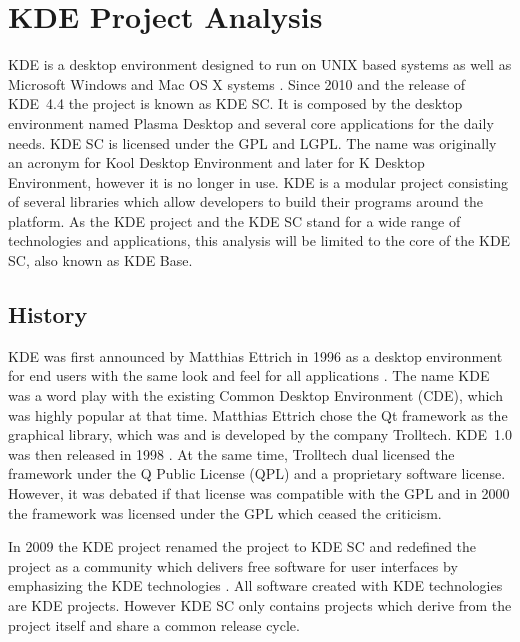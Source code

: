 \section{KDE Project Analysis} %


KDE is a desktop environment designed to run on UNIX based systems as well as
Microsoft Windows and Mac OS X systems \cite{KDEPress,KDEAbout}. Since 2010 and
the release of KDE~4.4 the project is known as \ac{KDE SC}. It is composed by
the desktop environment named Plasma Desktop and several core applications for
the daily needs. \ac{KDE SC} is licensed under the \ac{GPL} and \ac{LGPL}. The
name was originally an acronym for Kool Desktop Environment and later for K
Desktop Environment, however it is no longer in use. KDE is a modular project
consisting of several libraries which allow developers to build their programs
around the platform. As the KDE project and the \ac{KDE SC} stand for a wide
range of technologies and applications, this analysis will be limited to the
core of the \ac{KDE SC}, also known as KDE Base.

\subsection{History} %

KDE was first announced by Matthias Ettrich in 1996 as a desktop
environment for end users with the same look and feel for all applications
\cite{KDEAnnouncement}. The name KDE was a word play with the existing
Common Desktop Environment (CDE), which was highly popular at that time. Matthias Ettrich chose the Qt framework as the graphical library, which was and is
developed by the company Trolltech. KDE~1.0 was then released in 1998
\cite{KDEHistory}. At the same time, Trolltech dual licensed the framework
under the Q Public License (QPL) and a proprietary software license. However,
it was debated if that license was compatible with the \ac{GPL} and in 2000 the
framework was licensed under the \ac{GPL} which ceased the criticism.

In 2009 the KDE project renamed the project to \ac{KDE SC} and redefined the
project as a community which delivers free software for user interfaces by
emphasizing the KDE technologies \cite{KDESC}. All software created with KDE
technologies are KDE projects. However \ac{KDE SC} only contains projects which
derive from the project itself and share a common release cycle.


